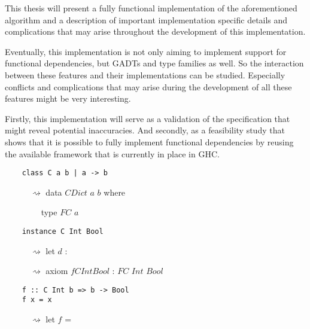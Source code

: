This thesis will present a fully functional implementation of the aforementioned
algorithm and a description of important implementation specific details and
complications that may arise throughout the development of this implementation.

Eventually, this implementation is not only aiming to implement support for functional dependencies,
but GADTs and type families as well. So the interaction between these features
and their implementations can be studied. Especially conflicts and complications
that may arise during the development of all these features might be very
interesting.

Firstly, this implementation will serve as a validation of the specification
that might reveal potential inaccuracies. And secondly, as a feasibility study
that shows that it is possible to fully implement functional dependencies by
reusing the available framework that is currently in place in GHC.

\begin{verbatim}
    class C a b | a -> b
\end{verbatim}
$\quad\quad\quad\rightsquigarrow$ data $CDict$ $a$ $b$ where

$\quad\quad\quad\quad$ type $FC$ $a$

\begin{verbatim}
    instance C Int Bool
\end{verbatim}
$\quad\quad\quad\rightsquigarrow$ let $d$ :

$\quad\quad\quad\rightsquigarrow$ axiom $fCIntBool$ : $FC$ $Int$ $Bool$

\begin{verbatim}
    f :: C Int b => b -> Bool
    f x = x
\end{verbatim}
$\quad\quad\quad\rightsquigarrow$ let $f$ =



